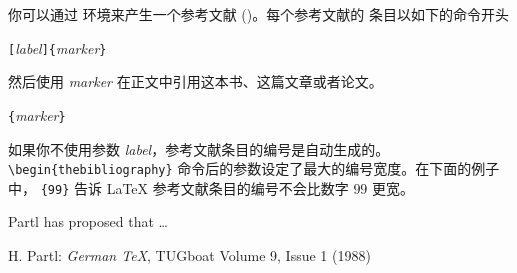
你可以通过  环境来产生一个参考文献 ()。每个参考文献的
条目以如下的命令开头
  \begin{lscommand}
    \verb|[|\emph{label}\verb|]{|\emph{marker}\verb|}|
  \end{lscommand}
然后使用 \emph{marker} 在正文中引用这本书、这篇文章或者论文。
  \begin{lscommand}
    \verb|{|\emph{marker}\verb|}|
  \end{lscommand}
如果你不使用参数 \emph{label}，参考文献条目的编号是自动生成的。 \verb|\begin{thebibliography}| 
命令后的参数设定了最大的编号宽度。在下面的例子中， \verb|{99}| 告诉
 \LaTeX{} 参考文献条目的编号不会比数字 $99$ 更宽。
 \begin{example}
 Partl \cite{pa} has
 proposed that \ldots
 \begin{thebibliography}{99}
  H. Partl:
 \emph{German \TeX},
 TUGboat Volume 9, Issue 1
  (1988)
 \end{thebibliography}
 \end{example}

\thispagestyle{fancyplain}

